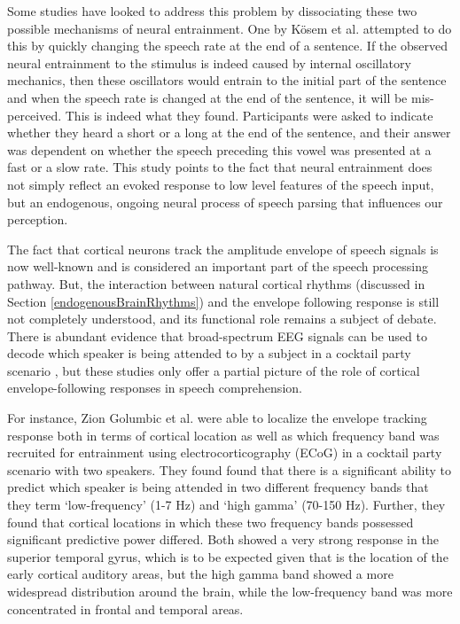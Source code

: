 \documentclass[titlepage]{article}
\begin{document}
    Some studies have looked to address this problem by dissociating these 
    two possible mechanisms of neural entrainment. One by K{\"o}sem et al.
    \cite{Kosem2017} attempted to do this by quickly changing the speech 
    rate at the end of a sentence. If the observed neural entrainment to the 
    stimulus is indeed caused by internal oscillatory mechanics, then these 
    oscillators would entrain to the initial part of the sentence and when the 
    speech rate is changed at the end of the sentence, it will be mis-perceived.
    This is indeed what they found. Participants were asked to indicate whether 
    they heard a short \textipa{[A]} or a long \textipa{[a:]} at the end of the 
    sentence, and their answer was dependent on whether the speech preceding 
    this vowel was presented at a fast or a slow rate. This study points to the 
    fact that neural entrainment does not simply reflect an evoked response 
    to low level features of the speech input, but an endogenous, ongoing 
    neural process of speech parsing that influences our perception. 

    The fact that cortical neurons track the amplitude envelope of speech
    signals is now well-known and is considered an important part of the speech
    processing pathway. But, the interaction between natural cortical rhythms
    (discussed in Section \ref{endogenousBrainRhythms}) and the envelope following
    response is still not completely understood, and its functional role remains
    a subject of debate. There is abundant evidence that broad-spectrum EEG
    signals can be used to decode which speaker is being attended to by a
    subject in a cocktail party scenario \cite{Horton2014,DeTaillez2018}, but
    these studies only offer a partial picture of the role of cortical
    envelope-following responses in speech comprehension.

    For instance, Zion Golumbic et al. \cite{ZionGolumbic2013} were able to
    localize the envelope tracking response both in terms of cortical location
    as well as which frequency band was recruited for entrainment using
    electrocorticography (ECoG) in a cocktail party scenario with two speakers.
    They found found that there is a significant ability to predict which
    speaker is being attended in two different frequency bands that they term
    `low-frequency' (1-7 Hz) and `high gamma' (70-150 Hz). Further, they found
    that cortical locations in which these two frequency bands possessed
    significant predictive power differed. Both showed a very strong response
    in the superior temporal gyrus, which is to be expected given that is the
    location of the early cortical auditory areas, but the high gamma band
    showed a more widespread distribution around the brain, while the
    low-frequency band was more concentrated in frontal and temporal areas.
\end{document}
